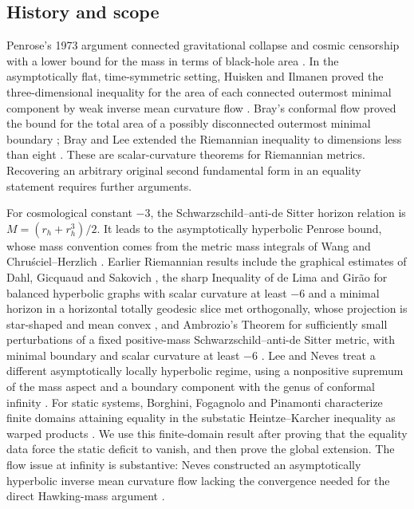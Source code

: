 \subsection{History and scope}\label{hist:history}

Penrose's 1973 argument connected gravitational collapse and cosmic censorship
with a lower bound for the mass in terms of black-hole area
\cite{penrose1973}.  In the asymptotically flat, time-symmetric setting,
Huisken and Ilmanen proved the three-dimensional inequality for the area of
each connected outermost minimal component by weak inverse mean curvature
flow \cite{huiskenilmanen2001}.  Bray's conformal flow proved the bound for
the total area of a possibly disconnected outermost minimal boundary
\cite{bray2001}; Bray and Lee extended the Riemannian inequality to dimensions
less than eight \cite{braylee2009}.  These are scalar-curvature theorems for
Riemannian metrics.  Recovering an arbitrary original second fundamental
form in an equality statement requires further arguments.

For cosmological constant $-3$, the Schwarzschild--anti-de Sitter horizon
relation is $M=(r_h+r_h^3)/2$.  It leads to the asymptotically hyperbolic
Penrose bound, whose mass convention comes from the metric mass integrals
of Wang and Chru\'sciel--Herzlich \cite{wang2001,chruscielherzlich2003}.
Earlier Riemannian results include the graphical estimates of Dahl,
Gicquaud and Sakovich \cite{dahlgicquaudsakovich2013}, the sharp Inequality
of de Lima and Gir\~ao for balanced hyperbolic graphs with scalar curvature
at least $-6$ and a minimal horizon in a horizontal totally geodesic slice
met orthogonally, whose projection is star-shaped and mean convex
\cite[Theorem~1.2]{delimagirao2016},
and Ambrozio's Theorem for sufficiently small perturbations of a fixed
positive-mass Schwarzschild--anti-de Sitter metric, with minimal boundary
and scalar curvature at least $-6$ \cite{ambrozio2015}.
Lee and Neves treat a different asymptotically locally hyperbolic regime,
using a nonpositive supremum of the mass aspect and a boundary component
with the genus of conformal infinity \cite{leeneves2015}.
For static systems, Borghini, Fogagnolo and Pinamonti characterize
finite domains attaining equality in the substatic Heintze--Karcher
inequality as warped products
\cite[Theorem~1.1]{borghinifogagnolopinamonti2024}.
We use this finite-domain result after proving that the equality data
force the static deficit to vanish, and then prove the global extension.
The flow issue at infinity is substantive: Neves constructed an
asymptotically hyperbolic inverse mean curvature flow lacking the convergence
needed for the direct Hawking-mass argument \cite{neves2010}.

